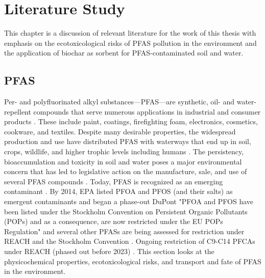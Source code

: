 \chapter{Literature Study}\label{chap:LitStudy}
This chapter is a discussion of relevant literature for the work of this thesis with emphasis on the ecotoxicological risks of PFAS pollution in the environment and the application of biochar as sorbent for PFAS-contaminated soil and water.

\section{PFAS}
Per- and polyfluorinated alkyl substances---PFAS---are synthetic, oil- and water-repellent compounds that serve numerous applications in industrial and consumer products \citep{Nicole2013}. These include paint, coatings, firefighting foam, electronics, cosmetics, cookware, and textiles. Despite many desirable properties, the widespread production and use have distributed PFAS with waterways that end up in soil, crops, wildlife, and higher trophic levels including humans \citep{bhhatarai2011}. The persistency, bioaccumulation and toxicity in soil and water poses a major environmental concern that has led to legislative action on the manufacture, sale, and use of several PFAS compounds \citep{EPA2014,ECHA2020,EC2020PFAS}. Today, PFAS is recognized as an emerging contaminant \citep{Ryu2021EC}. By 2014, EPA listed PFOA and PFOS (and their salts) as emergent contaminants and began a phase-out DuPont "PFOA and PFOS have been listed under the Stockholm Convention on Persistent Organic Pollutants (POPs) and as a consequence, are now restricted under the EU POPs Regulation" and several other PFASs are being assessed for restriction under REACH and the Stockholm Convention \citep{EC2020PFAS}. Ongoing restriction of C9-C14 PFCAs under REACH (phased out before 2023) \citep{ECHA2020}. This section looks at the physicochemical properties, ecotoxicological risks, and transport and fate of PFAS in the environment.


